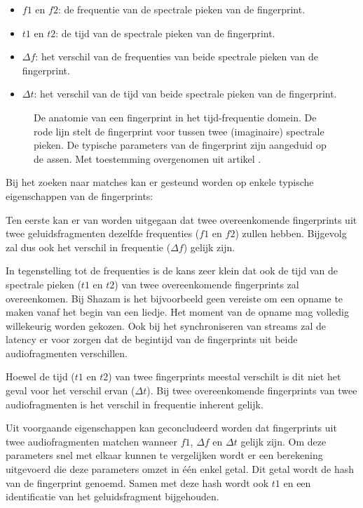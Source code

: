 \begin{itemize}[noitemsep]
	\item $ f1 $ en $ f2 $: de frequentie van de spectrale pieken van de fingerprint.
	\item $ t1 $ en $ t2 $: de tijd van de spectrale pieken van de fingerprint.
	\item $ \Delta f $: het verschil van de frequenties van beide spectrale pieken van de fingerprint.
	\item $ \Delta t $: het verschil van de tijd van beide spectrale pieken van de fingerprint.
\end{itemize}

\begin{figure}[h]
	\captionsetup{width=0.7\textwidth}
	\caption[De anatomie van een fingerprint]{De anatomie van een fingerprint in het tijd-frequentie domein. De rode lijn stelt de fingerprint voor tussen twee (imaginaire) spectrale pieken. De typische parameters van de fingerprint zijn aangeduid op de assen. Met toestemming overgenomen uit artikel \cite{six2015multimodal}.}
	\begin{center}
		\advance\parskip0.3cm
		
	\end{center}
\end{figure}

Bij het zoeken naar matches kan er gesteund worden op enkele typische eigenschappen van de fingerprints: 

Ten eerste kan er van worden uitgegaan dat twee overeenkomende fingerprints uit twee geluidsfragmenten dezelfde frequenties  ($f1$ en $f2$) zullen hebben. Bijgevolg zal dus ook het verschil in frequentie ($\Delta f$) gelijk zijn. 

In tegenstelling tot de frequenties is de kans zeer klein dat ook de tijd van de spectrale pieken ($t1$ en $t2$) van twee overeenkomende fingerprints zal overeenkomen. Bij Shazam is het bijvoorbeeld geen vereiste om een opname te maken vanaf het begin van een liedje. Het moment van de opname mag volledig willekeurig worden gekozen. Ook bij het synchroniseren van streams zal de latency er voor zorgen dat de begintijd van de fingerprints uit beide audiofragmenten verschillen.

Hoewel de tijd ($t1$ en $t2$) van twee fingerprints meestal verschilt is dit niet het geval voor het verschil ervan ($\Delta t$). Bij twee overeenkomende fingerprints van twee audiofragmenten is het verschil in frequentie inherent gelijk.

Uit voorgaande eigenschappen kan geconcludeerd worden dat fingerprints uit twee audiofragmenten matchen wanneer $ f1 $, $ \Delta f $ en $ \Delta t $ gelijk zijn. Om deze parameters snel met elkaar kunnen te vergelijken wordt er een berekening uitgevoerd die deze parameters omzet in één enkel getal. Dit getal wordt de hash van de fingerprint genoemd. Samen met deze hash wordt ook $ t1 $ en een identificatie van het geluidsfragment bijgehouden.

